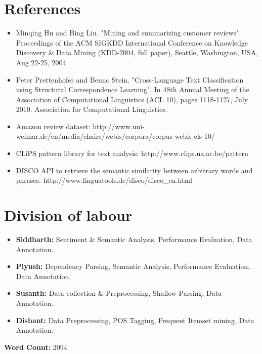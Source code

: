 \documentclass[conference]{IEEEtran}
\begin{document}
\section*{\textbf{References}}
\begin{itemize}
\item Minqing Hu and Bing Liu. "Mining and summarizing customer reviews". Proceedings of the ACM SIGKDD International Conference on Knowledge Discovery \& Data Mining (KDD-2004, full paper), Seattle, Washington, USA, Aug 22-25, 2004.
\item Peter Prettenhofer and Benno Stein. "Cross-Language Text Classification using Structural Correspondence Learning". In 48th Annual Meeting of the Association of Computational Linguistics (ACL 10), pages 1118-1127, July 2010. Association for Computational Linguistics.
\item Amazon review dataset: http://www.uni-weimar.de/en/media/chairs/webis/corpora/corpus-webis-cls-10/
\item CLiPS pattern library for text analysis: http://www.clips.ua.ac.be/pattern
\item DISCO API to retrieve the semantic similarity between arbitrary words and phrases.
http://www.linguatools.de/disco/disco\_en.html

\end{itemize}
\section*{\textbf{Division of labour}}
\begin{itemize}
\item \textbf{Siddharth:} Sentiment \& Semantic Analysis, Performance Evaluation, Data Annotation.
\item \textbf{Piyush:} Dependency Parsing, Semantic Analysis, Performance Evaluation, Data Annotation.
\item \textbf{Susanth:} Data collection \& Preprocessing, Shallow Parsing, Data Annotation.
\item \textbf{Dishant:} Data Preprocessing, POS Tagging, Frequent Itemset mining, Data Annotation.
\end{itemize}


\textbf{Word Count:} 2094
\end{document}
